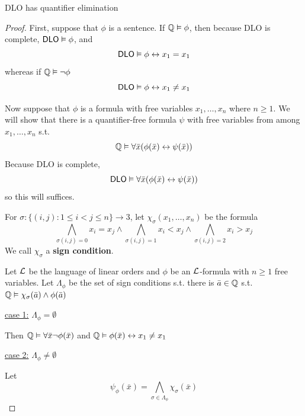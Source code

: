 \documentclass[11pt]{article}
\begin{document}
\begin{theorem}[]
DLO has quantifier elimination
\end{theorem}
\begin{proof}
First, suppose that \(\phi\) is a sentence. If \(\mathbb{Q}\vDash\phi\), then
because DLO is complete, \(\operatorname{\textsf{DLO}}\vDash\phi\), and 
\begin{equation*}
\operatorname{\textsf{DLO}}\vDash\phi\leftrightarrow x_1=x_1
\end{equation*}
whereas if \(\mathbb{Q}\vDash\neg\phi\)
\begin{equation*}
\operatorname{\textsf{DLO}}\vDash\phi\leftrightarrow x_1\neq x_1
\end{equation*}

Now suppose that \(\phi\) is a formula with free variables \(x_1,\dots,x_n\) where
\(n\ge1\). We will show that there is a quantifier-free formula \(\psi\) with free
variables from among \(x_1,\dots,x_n\) s.t.
\begin{equation*}
\mathbb{Q}\vDash\forall\bar{x}(\phi(\bar{x})\leftrightarrow\psi(\bar{x}))
\end{equation*}
Because DLO is complete,
\begin{equation*}
\operatorname{\textsf{DLO}}\vDash\forall\bar{x}(\phi(\bar{x})\leftrightarrow\psi(\bar{x}))
\end{equation*}
so this will suffices.

For \(\sigma:\{(i,j):1\le i<j\le n\}\to3\), let \(\chi_\sigma(x_1,\dots,x_n)\) be the formula
\begin{equation*}
\displaystyle\bigwedge_{\sigma(i,j)=0}x_i=x_j\wedge
\bigwedge_{\sigma(i,j)=1}x_i<x_j\wedge
\bigwedge_{\sigma(i,j)=2}x_i>x_j
\end{equation*}
We call \(\chi_\sigma\) a \textbf{sign condition}.

Let \(\mathcal{L}\) be the language of linear orders and \(\phi\) be an
\(\mathcal{L}\)-formula with \(n\ge1\) free variables. Let \(\Lambda_\phi\) be the
set of sign conditions s.t. there is \(\bar{a}\in\mathbb{Q}\) s.t.
\(\mathbb{Q}\vDash\chi_\sigma(\bar{a})\wedge\phi(\bar{a})\)


\uline{case 1:} \(\Lambda_\phi=\emptyset\)

Then \(\mathbb{Q}\vDash\forall\bar{x}\neg\phi(\bar{x})\) and
\(\mathbb{Q}\vDash\phi(\bar{x})\leftrightarrow x_1\neq x_1\)

\uline{case 2:} \(\Lambda_\phi\neq\emptyset\)

Let
\begin{equation*}
\psi_\phi(\bar{x})=\displaystyle\bigwedge_{\sigma\in\Lambda_\phi}\chi_\sigma(\bar{x})
\end{equation*}


\end{proof}
\end{document}
